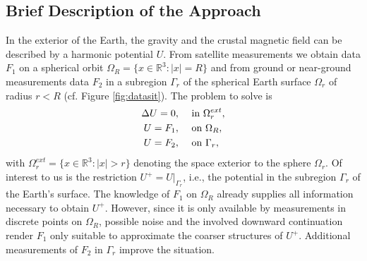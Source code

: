 \documentclass[a4paper, 10pt]{article}
\numberwithin{equation}{section}
\theoremstyle{definition}
\begin{document}
\subsection{Brief Description of the Approach}

In the exterior of the Earth, the gravity and the crustal magnetic field can be described by a harmonic potential $U$. From satellite measurements we obtain data $F_1$ on a spherical orbit $\Omega_R=\{x\in\mathbb{R}^3:|x|=R\}$ and from ground or near-ground measurements data $F_2$ in a subregion $\Gamma_r$ of the spherical Earth surface $\Omega_r$ of radius $r<R$ (cf. Figure \ref{fig:datasit}). The problem to solve is
\begin{align}
\Delta U=0,\quad&\textnormal{ in }\Omega_r^{ext},\label{eqn:11}
\\U=F_1,\quad&\textnormal{ on }\Omega_R,\label{eqn:12}
\\U=F_2,\quad&\textnormal{ on }\Gamma_r,\label{eqn:13}
\end{align}
with $\Omega_r^{ext}=\{x\in\mathbb{R}^3:|x|>r\}$ denoting the space exterior to the sphere $\Omega_r$. Of interest to us is the restriction $U^+=U|_{\Gamma_r}$, i.e., the potential in the subregion $\Gamma_r$ of the Earth's surface. The knowledge of $F_1$ on $\Omega_R$ already supplies all information necessary to obtain $U^+$. However, since it is only available by measurements in discrete points on $\Omega_R$, possible noise and the involved downward continuation render $F_1$ only suitable to approximate the coarser structures of $U^+$. Additional measurements of $F_2$ in $\Gamma_r$ improve the situation.  
\end{document}
